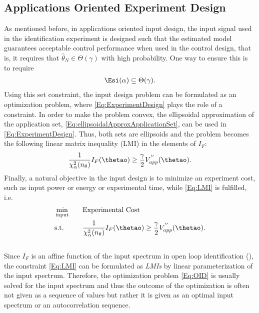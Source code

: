 \documentclass{ifacconf}
\begin{document}
\subsection{Applications Oriented Experiment Design}
As mentioned before, in applications oriented input design, the input signal used in the identification experiment is designed such that the estimated model guarantees acceptable control performance when used in the control design, that is, it requires that $\hat{\theta}_N \in \Theta(\gamma)$  with high probability. One way to ensure this is to require
\begin{align} \label{Eq:ExperimentDesign}
	\Esi(\alpha) \subseteq  \Theta(\gamma).
\end{align}
Using this set constraint, the input design problem can be formulated as an optimization problem, where \eqref{Eq:ExperimentDesign} plays the role of a constraint. In order to make the problem convex, the ellipsoidal approximation of the application set, \eqref{Eq:ellipsoidalApproxApplicationSet}, can be used in \eqref{Eq:ExperimentDesign}. Thus, both sets are ellipsoids and the problem becomes the following linear matrix inequality (LMI) in the elements of $I_F$:
\begin{equation} \label{Eq:LMI}
	\frac{1}{\chi^2_\alpha(n_\theta)}I_F(\thetao) \geq \frac{\gamma}{2}V^{''}_{app}(\thetao).
\end{equation}
Finally, a natural objective in the input design is to minimize an experiment cost, such as input power or energy or experimental time, while \eqref{Eq:LMI} is fulfilled, i.e.
\vspace{-0.4cm}
\begin{eqnarray} \label{Eq:OID}
\begin{split}
&\min_{\substack {\text{input}}} \quad 	
								&&\text{Experimental Cost}\\
&\text{s.t.} \quad
								&&\frac{1}{\chi^2_\alpha(n_\theta)}I_F(\thetao) \geq \frac{\gamma}{2}V^{''}_{app}(\thetao).
\end{split}
\end{eqnarray}
\\
Since $I_F$ is an affine function of the input spectrum in open loop identification (\cite{L.Ljung1999}), the constraint \eqref{Eq:LMI} can be formulated as \emph{LMIs} by linear parameterization of the input spectrum. Therefore, the optimization problem \eqref{Eq:OID} is usually solved for the input spectrum and thus the outcome of the optimization is often not given as a sequence of values but rather it is given as an optimal input spectrum or an autocorrelation sequence. 
\end{document}
